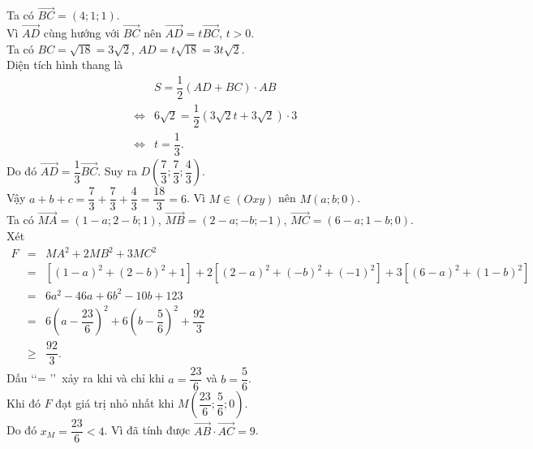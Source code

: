\begin{ex}
{\begin{itemchoice}
			\itemch Ta có $\overrightarrow{BC}=(4;1;1)$.\\
			Vì $\overrightarrow{AD}$ cùng hướng với $\overrightarrow{BC}$ nên $\overrightarrow{AD}=t\overrightarrow{BC}$, $t>0$.\\
			Ta có $BC=\sqrt{18}=3\sqrt{2}$, $AD=t\sqrt{18}=3t\sqrt{2}$.\\		
			Diện tích hình thang là
			\begin{eqnarray*}
				&&S=\dfrac{1}{2}(AD+BC)\cdot AB\\
				&\Leftrightarrow&6\sqrt{2}=\dfrac{1}{2}(3\sqrt{2}t+3\sqrt{2})\cdot 3\\
				&\Leftrightarrow&t=\dfrac{1}{3}.
			\end{eqnarray*}
			Do đó $\overrightarrow{AD}=\dfrac{1}{3}\overrightarrow{BC}$. Suy ra $D\left(\dfrac{7}{3};\dfrac{7}{3};\dfrac{4}{3}\right)$.\\
			Vậy $a+b+c=\dfrac{7}{3}+\dfrac{7}{3}+\dfrac{4}{3}=\dfrac{18}{3}=6$.
			\itemch Vì $M\in (Oxy)$ nên $M(a; b; 0)$.\\
			Ta có $\overrightarrow{MA}=(1-a; 2-b; 1)$, $\overrightarrow{MB}=(2-a; -b; -1)$, $\overrightarrow{MC}=(6-a; 1-b; 0)$.\\
			Xét
			\begin{eqnarray*}
				F&=&MA^2+2MB^2+3MC^2\\
				&=&\left[(1-a)^2+(2-b)^2+1\right]+2\left[(2-a)^2+(-b)^2+(-1)^2\right]+3\left[(6-a)^2+(1-b)^2\right]\\
				&=&6a^2-46a+6b^2-10b+123\\
				&=&6\left(a-\dfrac{23}{6}\right)^2+6\left(b-\dfrac{5}{6}\right)^2+\dfrac{92}{3}\\
				&\ge &\dfrac{92}{3}.
			\end{eqnarray*}
			Dấu \lq\lq = \rq\rq\, xảy ra khi và chỉ khi $a=\dfrac{23}{6}$ và $b=\dfrac{5}{6}$.\\
			Khi đó $F$ đạt giá trị nhỏ nhất khi $M\left(\dfrac{23}{6};\dfrac{5}{6};0\right)$.\\
			Do đó $x_M=\dfrac{23}{6}<4$.		
			\itemch Vì đã tính được  $\overrightarrow{AB}\cdot\overrightarrow{AC}=9$.
		\end{itemchoice}
	}
\end{ex}
